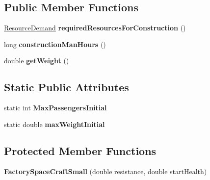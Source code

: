 \subsection*{Public Member Functions}
\begin{DoxyCompactItemize}
\item 
\hyperlink{classuniverse_1_1_resource_demand}{Resource\+Demand} {\bfseries required\+Resources\+For\+Construction} ()\hypertarget{classtools_1_1vehicles_1_1space_1_1_factory_space_craft_small_a8d2ee72f109fc93e8ea691069306da46}{}\label{classtools_1_1vehicles_1_1space_1_1_factory_space_craft_small_a8d2ee72f109fc93e8ea691069306da46}

\item 
long {\bfseries construction\+Man\+Hours} ()\hypertarget{classtools_1_1vehicles_1_1space_1_1_factory_space_craft_small_abcce1979dab54677523d751254c4e2dd}{}\label{classtools_1_1vehicles_1_1space_1_1_factory_space_craft_small_abcce1979dab54677523d751254c4e2dd}

\item 
double {\bfseries get\+Weight} ()\hypertarget{classtools_1_1vehicles_1_1space_1_1_factory_space_craft_small_a4681d09248fd7d8e3241e0a1cfca6e4d}{}\label{classtools_1_1vehicles_1_1space_1_1_factory_space_craft_small_a4681d09248fd7d8e3241e0a1cfca6e4d}

\end{DoxyCompactItemize}
\subsection*{Static Public Attributes}
\begin{DoxyCompactItemize}
\item 
static int {\bfseries Max\+Passengers\+Initial}\hypertarget{classtools_1_1vehicles_1_1space_1_1_factory_space_craft_small_a16b24ecbc1d29f8618a4a3ba726861df}{}\label{classtools_1_1vehicles_1_1space_1_1_factory_space_craft_small_a16b24ecbc1d29f8618a4a3ba726861df}

\item 
static double {\bfseries max\+Weight\+Initial}\hypertarget{classtools_1_1vehicles_1_1space_1_1_factory_space_craft_small_adcb597a6a9b9379a72eebf67cbc6f7e8}{}\label{classtools_1_1vehicles_1_1space_1_1_factory_space_craft_small_adcb597a6a9b9379a72eebf67cbc6f7e8}

\end{DoxyCompactItemize}
\subsection*{Protected Member Functions}
\begin{DoxyCompactItemize}
\item 
{\bfseries Factory\+Space\+Craft\+Small} (double resistance, double start\+Health)\hypertarget{classtools_1_1vehicles_1_1space_1_1_factory_space_craft_small_adfb5001688df940a0ba8d43bf327155e}{}\label{classtools_1_1vehicles_1_1space_1_1_factory_space_craft_small_adfb5001688df940a0ba8d43bf327155e}

\end{DoxyCompactItemize}

